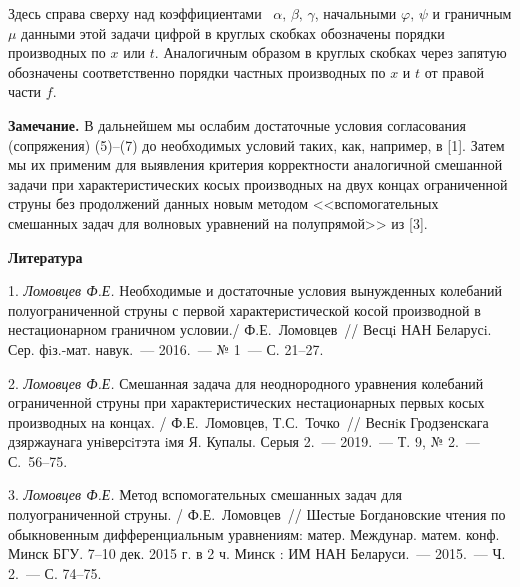  Здесь справа сверху над коэффициентами ~$\alpha,\, \beta,\, \gamma$, начальными $\varphi,\,\psi$
и граничным $\mu$ данными этой задачи цифрой в круглых скобках
обозначены порядки производных по $x$ или $t$. Аналогичным образом
в круглых скобках через запятую обозначены соответственно порядки
частных производных по $x$ и $t$ от правой части $f$.

{\bf Замечание.} В дальнейшем мы ослабим достаточные условия
согласования (сопряжения) (5)--(7) до необходимых условий таких,
как, например, в [1]. Затем мы их применим для выявления критерия
корректности аналогичной смешанной задачи при характеристических
косых производных на двух концах ограниченной струны без
продолжений данных новым методом <<вспомогательных смешанных задач
для волновых уравнений на полупрямой>> из [3].

\smallskip \centerline{\bf Литература}\nopagebreak

1. \textit{Ломовцев Ф.Е.}  {Необходимые и достаточные условия
вынужденных колебаний полуограниченной струны с первой
характеристической косой производной в нестационарном граничном
условии./ Ф.Е.~Ломовцев~// Весцi НАН Беларусi. Сер. фiз.-мат.
навук.~--- 2016.~--- № 1~--- С. 21--27.}


2. \textit{Ломовцев Ф.Е.} {Смешанная задача для неоднородного
уравнения колебаний ограниченной струны при характеристических
нестационарных первых косых производных на концах. /
Ф.Е.~Ломовцев, Т.С.~Точко~// Веснiк Гродзенскага дзяржаунага
унiверсiтэта iмя Я. Купалы. Серыя 2.~--- 2019.~--- Т. 9, № 2.~---
С.~56--75.}


3. \textit{Ломовцев Ф.Е.} {Метод вспомогательных смешанных задач
для полуограниченной струны. / Ф.Е.~Ломовцев~// Шестые
Богдановские чтения по обыкновенным дифференциальным уравнениям:
матер. Междунар. матем. конф. Минск БГУ. 7--10 дек. 2015 г. в 2 ч.
Минск : ИМ НАН Беларуси.~--- 2015.~--- Ч. 2.~--- С. 74--75.}


